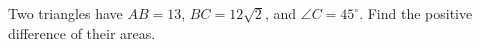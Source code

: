 Two triangles have $AB=13$, $BC=12\sqrt2$, and $\angle C=45^\circ$. Find the positive difference of their areas.
